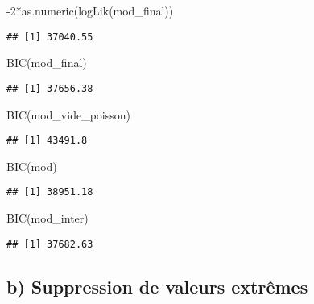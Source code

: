 \documentclass[
]{article}
\newenvironment{Shaded}{\begin{snugshade}}{\end{snugshade}}
\newcommand{\DecValTok}[1]{\textcolor[rgb]{0.00,0.00,0.81}{#1}}
\newcommand{\FunctionTok}[1]{\textcolor[rgb]{0.00,0.00,0.00}{#1}}
\newcommand{\NormalTok}[1]{#1}
\newcommand{\SpecialCharTok}[1]{\textcolor[rgb]{0.00,0.00,0.00}{#1}}
\begin{document}
\begin{Shaded}
\begin{Highlighting}[]
\SpecialCharTok{{-}}\DecValTok{2}\SpecialCharTok{*}\FunctionTok{as.numeric}\NormalTok{(}\FunctionTok{logLik}\NormalTok{(mod\_final))}
\end{Highlighting}
\end{Shaded}

\begin{verbatim}
## [1] 37040.55
\end{verbatim}

\begin{Shaded}
\begin{Highlighting}[]
\FunctionTok{BIC}\NormalTok{(mod\_final)}
\end{Highlighting}
\end{Shaded}

\begin{verbatim}
## [1] 37656.38
\end{verbatim}

\begin{Shaded}
\begin{Highlighting}[]
\FunctionTok{BIC}\NormalTok{(mod\_vide\_poisson)}
\end{Highlighting}
\end{Shaded}

\begin{verbatim}
## [1] 43491.8
\end{verbatim}

\begin{Shaded}
\begin{Highlighting}[]
\FunctionTok{BIC}\NormalTok{(mod)}
\end{Highlighting}
\end{Shaded}

\begin{verbatim}
## [1] 38951.18
\end{verbatim}

\begin{Shaded}
\begin{Highlighting}[]
\FunctionTok{BIC}\NormalTok{(mod\_inter)}
\end{Highlighting}
\end{Shaded}

\begin{verbatim}
## [1] 37682.63
\end{verbatim}

\hypertarget{b-suppression-de-valeurs-extruxeames}{%
\subsection{b) Suppression de valeurs
extrêmes}\label{b-suppression-de-valeurs-extruxeames}}
\end{document}
